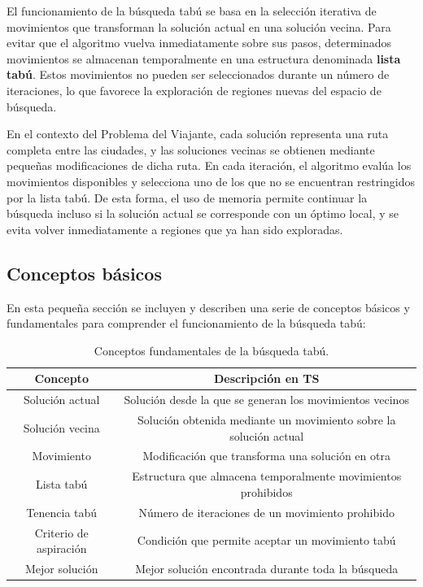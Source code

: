 El funcionamiento de la búsqueda tabú se basa en la selección iterativa de movimientos que transforman la solución actual
en una solución vecina. Para evitar que el algoritmo vuelva inmediatamente sobre sus pasos, determinados movimientos
se almacenan temporalmente en una estructura denominada \textbf{lista tabú}. Estos movimientos no pueden ser seleccionados
durante un número de iteraciones, lo que favorece la exploración de regiones nuevas del espacio de búsqueda. 

En el contexto del Problema del Viajante, cada solución representa una ruta completa entre las ciudades, y las soluciones 
vecinas se obtienen mediante pequeñas modificaciones de dicha ruta. En cada iteración, el algoritmo evalúa los movimientos
disponibles y selecciona uno de los que no se encuentran restringidos por la lista tabú. De esta forma, el uso de memoria 
permite continuar la búsqueda incluso si la solución actual se corresponde con un óptimo local, y se evita volver 
inmediatamente a regiones que ya han sido exploradas.

\subsection{Conceptos básicos}
\label{subsec:ts_concepts}

En esta pequeña sección se incluyen y describen una serie de conceptos básicos y fundamentales para comprender el funcionamiento 
de la búsqueda tabú:

\begin{table}[ht]
    \renewcommand{\arraystretch}{1.3}
    \caption{Conceptos fundamentales de la búsqueda tabú.}
    \label{tab:ts_concepts}
    \begin{center}
        \begin{tabular}{|c|c|}
            \hline
            \textbf{Concepto} & \textbf{Descripción en TS} \\
            \hline
            Solución actual & Solución desde la que se generan los movimientos vecinos \\
            \hline
            Solución vecina & Solución obtenida mediante un movimiento sobre la solución actual \\
            \hline
            Movimiento & Modificación que transforma una solución en otra \\
            \hline
            Lista tabú & Estructura que almacena temporalmente movimientos prohibidos \\
            \hline
            Tenencia tabú & Número de iteraciones de un movimiento prohibido \\
            \hline
            Criterio de aspiración & Condición que permite aceptar un movimiento tabú \\
            \hline
            Mejor solución & Mejor solución encontrada durante toda la búsqueda \\
            \hline
        \end{tabular}
    \end{center}
\end{table}

